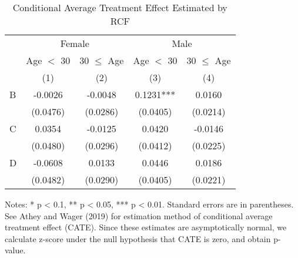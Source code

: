 \documentclass[12pt, a4paper]{article}
\begin{document}
\begin{table}

\caption{\label{tab:rcf-int-cate}Conditional Average Treatment Effect Estimated by RCF}
\centering
\fontsize{9}{11}\selectfont
\begin{threeparttable}
\begin{tabular}[t]{lcccc}
\toprule
\multicolumn{1}{c}{ } & \multicolumn{2}{c}{Female} & \multicolumn{2}{c}{Male} \\
\cmidrule(l{3pt}r{3pt}){2-3} \cmidrule(l{3pt}r{3pt}){4-5}
\multicolumn{1}{c}{ } & \multicolumn{1}{c}{Age $<$ 30} & \multicolumn{1}{c}{30 $\le$ Age} & \multicolumn{1}{c}{Age $<$ 30} & \multicolumn{1}{c}{30 $\le$ Age} \\
\cmidrule(l{3pt}r{3pt}){2-2} \cmidrule(l{3pt}r{3pt}){3-3} \cmidrule(l{3pt}r{3pt}){4-4} \cmidrule(l{3pt}r{3pt}){5-5}
 & (1) & (2) & (3) & (4)\\
\midrule
B & -0.0026 & -0.0048 & 0.1231*** & 0.0160\\
 & (0.0476) & (0.0286) & (0.0405) & (0.0214)\\
C & 0.0354 & -0.0125 & 0.0420 & -0.0146\\
 & (0.0480) & (0.0296) & (0.0412) & (0.0225)\\
D & -0.0608 & 0.0133 & 0.0446 & 0.0186\\
 & (0.0482) & (0.0290) & (0.0405) & (0.0221)\\
\bottomrule
\end{tabular}
\begin{tablenotes}
\item Notes: * p < 0.1, ** p < 0.05, *** p < 0.01. Standard errors are in parentheses. See Athey and Wager (2019) for estimation method of conditional average treatment effect (CATE). Since these estimates are asymptotically normal, we calculate z-score under the null hypothesis that CATE is zero, and obtain p-value. 
\end{tablenotes}
\end{threeparttable}
\end{table}
\end{document}
